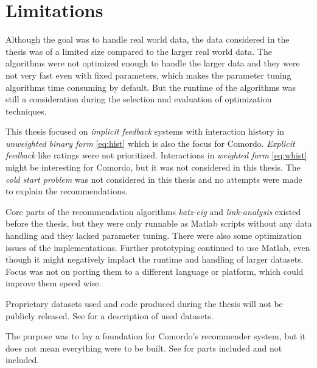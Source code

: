 
\section{Limitations}\label{sec:intro:limitations}

Although the goal was to handle real world data, the data considered in the thesis was of a limited size compared to the larger real world data. The algorithms were not optimized enough to handle the larger data and they were not very fast even with fixed parameters, which makes the parameter tuning algorithms time consuming by default. But the runtime of the algorithms was still a consideration during the selection and evaluation of optimization techniques.

This thesis focused on \textit{implicit feedback} systems with interaction history in \textit{unweighted binary form} \eqref{eq:hist} which is also the focus for Comordo. \textit{Explicit feedback} like ratings were not prioritized. Interactions in \textit{weighted form} \eqref{eq:whist} might be interesting for Comordo, but it was not considered in this thesis. The \textit{cold start problem} \citep{cacheda2011comparison} was not considered in this thesis and no attempts were made to explain the recommendations.

Core parts of the recommendation algorithms \textit{katz-eig} and \textit{link-analysis} existed before the thesis, but they were only runnable as Matlab scripts without any data handling and they lacked parameter tuning. There were also some optimization issues of the implementations. Further prototyping continued to use Matlab, even though it might negatively implact the runtime and handling of larger datasets.
Focus was not on porting them to a different language or platform, which could improve them speed wise.

Proprietary datasets used and code produced during the thesis will not be publicly released. See  for a description of used datasets.

The purpose was to lay a foundation for Comordo's recommender system, but it does not mean everything were to be built. See  for parts included and not included.

